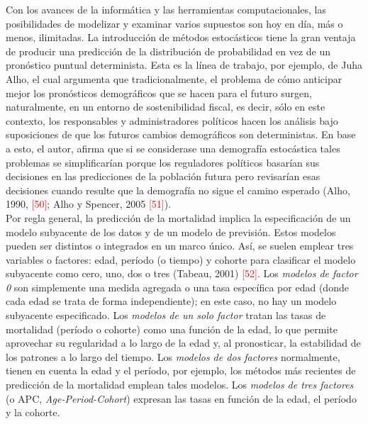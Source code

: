 Con los avances de la informática y las herramientas computacionales, las posibilidades de modelizar y examinar varios supuestos son hoy en día, más o menos, ilimitadas. La introducción de métodos estocásticos tiene la gran ventaja de producir una predicción de la distribución de probabilidad en vez de un pronóstico puntual determinista. Esta es la línea de trabajo, por ejemplo, de Juha Alho, el cual argumenta que tradicionalmente, el problema de cómo anticipar mejor los pronósticos demográficos que se hacen para el futuro surgen, naturalmente, en un entorno de sostenibilidad fiscal, es decir, sólo en este contexto, los responsables y administradores políticos hacen los análisis bajo suposiciones de que los futuros cambios demográficos son deterministas. En base a esto, el autor, afirma que si se considerase una demografía estocástica tales problemas se simplificarían porque los reguladores políticos basarían sus decisiones en las predicciones de la población futura pero revisarían esas decisiones cuando resulte que la demografía no sigue el camino esperado (Alho, 1990, \textcolor{red}{[50]}; Alho y Spencer, 2005 \textcolor{red}{[51]}).\\

Por regla general, la predicción de la mortalidad implica la especificación de un modelo subyacente de los datos y de un modelo de previsión. Estos modelos pueden ser distintos o integrados en un marco único. Así, se suelen emplear tres variables o factores: edad, período (o tiempo) y cohorte para clasificar el modelo subyacente como cero, uno, dos o tres (Tabeau, 2001) \textcolor{red}{[52]}. Los \textit{modelos de factor 0} son simplemente una medida agregada o una tasa específica por edad (donde cada edad se trata de forma independiente); en este caso, no hay un modelo subyacente especificado. Los \textit{modelos de un solo factor} tratan las tasas de mortalidad (período o cohorte) como una función de la edad, lo que permite aprovechar su regularidad a lo largo de la edad y, al pronosticar, la estabilidad de los patrones a lo largo del tiempo. Los \textit{modelos de dos factores} normalmente, tienen en cuenta la edad y el período, por ejemplo, los métodos más recientes de predicción de la mortalidad emplean tales modelos. Los \textit{modelos de tres factores} (o APC, \textit{Age-Period-Cohort}) expresan las tasas en función de la edad, el período y la cohorte.\\

